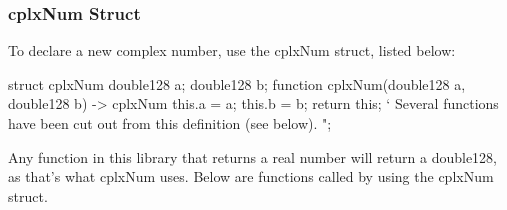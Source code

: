 \documentclass[12pt, letterpaper, oneside]{article}
\begin{document}
	\subsubsection{cplxNum Struct}
	To declare a new complex number, use the cplxNum struct, listed below:
	\newline
	
	\begin{spverbatim}
		struct cplxNum {
			double128 a;
			double128 b;
			function cplxNum(double128 a, double128 b) -> cplxNum {
				this.a = a;
				this.b = b;
				return this;
			}
			` Several functions have been cut out from this definition (see below).
		}
		";	
	\end{spverbatim}
	Any function in this library that returns a real number will return a double128, as that's what cplxNum uses.
	Below are functions called by using the cplxNum struct.
\end{document}
